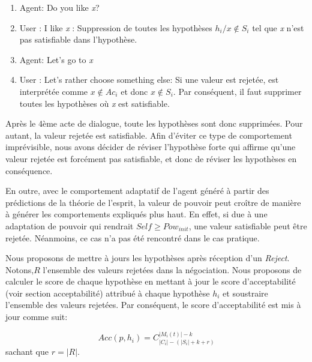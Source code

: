 \documentclass[conference, letterpaper]{article}
\begin{document}
					\begin{enumerate}
						\item	Agent: Do you like \emph{x}?	
						\item	User : I like \emph{x} : Suppression de toutes les hypothèses $h_i / x \notin S_i$ tel que \emph{x} n'est pas satisfiable dans l'hypothèse. 
						\item	Agent: Let's go to \emph{x}
						\item	User : Let's rather choose something else: Si une valeur est rejetée, est interprétée comme $x \notin Ac_i$ et donc $x \notin S_i$.
						Par conséquent, il faut supprimer toutes les hypothèses où \emph{x} est satisfiable. 
					\end{enumerate}
			Après le 4ème acte de dialogue, toute les hypothèses sont donc supprimées. Pour autant, la valeur rejetée est satisfiable. 
			Afin d'éviter ce type de comportement imprévisible, nous avons décider de réviser l'hypothèse forte qui affirme qu'une valeur rejetée est forcément pas satisfiable, et donc de réviser les hypothèses en conséquence. 
		
			En outre, avec le comportement adaptatif de l'agent généré à partir des prédictions de la théorie de l'esprit, la valeur de pouvoir peut croître de  manière à générer les comportements expliqués plus haut. En effet, si due à une adaptation de pouvoir qui rendrait $ Self \geq Pow_{init}$, une valeur satisfiable peut être rejetée. Néanmoins, ce cas n'a pas été rencontré dans le cas pratique. 
			
			Nous proposons de mettre à jours les hypothèses après réception d'un \emph{Reject}.
			Notons,$R$ l'ensemble des valeurs rejetées dans la négociation. Nous proposons de calculer le score de chaque hypothèse en mettant à jour le score d'acceptabilité (voir section acceptabilité) attribué à chaque hypothèse $h_i$ et soustraire l'ensemble des valeurs rejetées.
			Par conséquent, le score d'acceptabilité est mis à jour comme suit:
			
			\begin{equation}
			Acc(p, h_i) = C_{|C_i|-(|S_i| + k + r)}^{|M_i(t)| - k}
			\end{equation}
			sachant que $r = |R|$.
			
	
	
\end{document}
